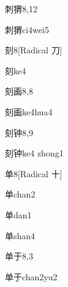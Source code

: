 \begin{entry}{刺猬}{8,12}
  \begin{phonetics}{刺猬}{ci4wei5}
  \end{phonetics}
\end{entry}

\begin{entry}{刻}{8}[Radical 刀]
  \begin{phonetics}{刻}{ke4}
  \end{phonetics}
\end{entry}

\begin{entry}{刻画}{8,8}
  \begin{phonetics}{刻画}{ke4hua4}
  \end{phonetics}
\end{entry}

\begin{entry}{刻钟}{8,9}
  \begin{phonetics}{刻钟}{ke4 zhong1}
  \end{phonetics}
\end{entry}

\begin{entry}{单}{8}[Radical 十]
  \begin{phonetics}{单}{chan2}
  \end{phonetics}
  \begin{phonetics}{单}{dan1}
  \end{phonetics}
  \begin{phonetics}{单}{shan4}
  \end{phonetics}
\end{entry}

\begin{entry}{单于}{8,3}
  \begin{phonetics}{单于}{chan2yu2}
  \end{phonetics}
\end{entry}

